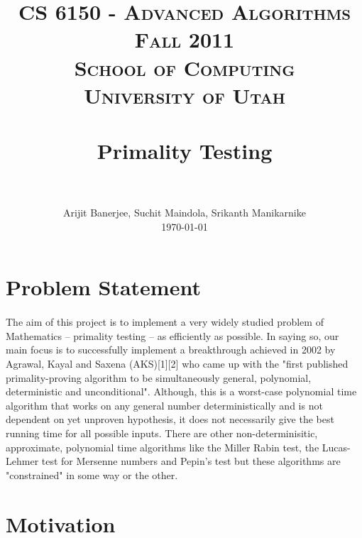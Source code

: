 \documentclass[paper=a4, fontsize=11pt]{scrartcl}	%
\title{
    \usefont{OT1}{bch}{b}{n}
    \normalfont \normalsize \textsc{CS 6150 - Advanced Algorithms\\
    Fall 2011\\
    School of Computing\\ 
    University of Utah} \\ [25pt]
    \horrule{0.5pt} \\[0.4cm]
    \huge Primality Testing \\
    \horrule{2pt} \\[0.5cm]
}
\author{
    \normalfont \normalsize Arijit Banerjee, Suchit Maindola, Srikanth Manikarnike\\
    [-3pt] \normalsize \today
}
\date{}
\numberwithin{equation}{section}		%
\numberwithin{figure}{section}		%
\numberwithin{table}{section}		%
\begin{document}

\maketitle
\section{Problem Statement}
\paragraph{}The aim of this project is to implement a very widely studied problem of Mathematics -- primality testing -- as efficiently as possible. In saying so, our main focus is to successfully implement a breakthrough achieved in 2002 by Agrawal, Kayal and Saxena (AKS)[1][2] who came up with the "first published primality-proving algorithm to be simultaneously general, polynomial, deterministic and unconditional". Although, this is a worst-case polynomial time algorithm that works on any general number deterministically and is not dependent on yet unproven hypothesis, it does not necessarily give the best running time for all possible inputs. There are other non-determinisitic, approximate, polynomial time algorithms like the Miller Rabin test, the Lucas-Lehmer test for Mersenne numbers and Pepin's test but these algorithms are "constrained" in some way or the other.

\section{Motivation}
\end{document}
